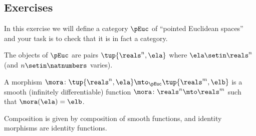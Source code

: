 \subsection{Exercises}

\begin{gradedexercise}
    \label{ex:pointed-euclidean-spaces}

    In this exercise we will define a category $\pEuc$ of ``pointed Euclidean spaces'' and your task is to check that it is in fact a category.

    The objects of $\pEuc$ are pairs $\tup{\reals^n, \ela}$ where $\ela \setin \reals^n$ (and $n \setin \natnumbers$ varies).

    A morphism $\mora \colon \tup{\reals^n, \ela} \mto_{\pEuc} \tup{\reals^m, \elb}$ is a smooth (infinitely differentiable) function $\mora \colon \reals^n \mto \reals^m$ such that $\mora(\ela) = \elb$.

    Composition is given by composition of smooth functions, and identity morphisms are identity functions.

\end{gradedexercise}

